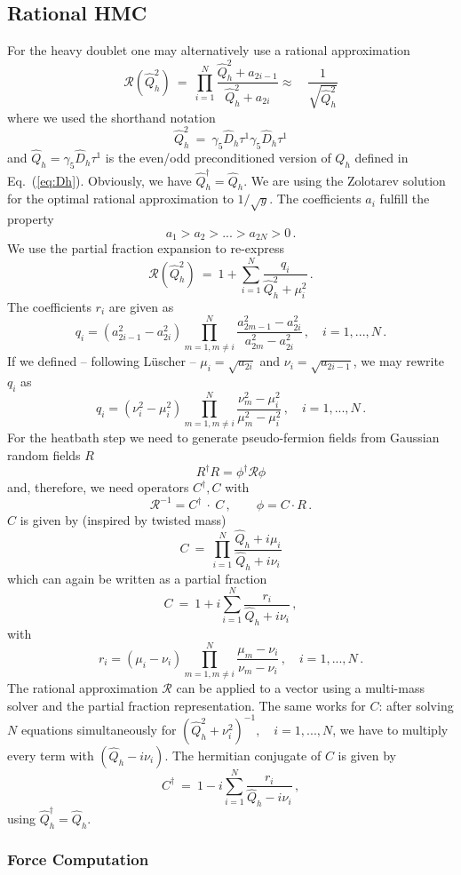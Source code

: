 \subsection{Rational HMC}

For the heavy doublet one may alternatively use a rational
approximation 
\[
\mathcal{R}(\hat Q_h^2)\ = \ \prod_{i = 1}^N \frac{\hat Q_h^2 +
  a_{2i-1}}{\hat Q_h^2 + a_{2i}}\approx\quad\frac{1}{\sqrt{\hat Q_h^2}}
\]
where we used the shorthand notation
\[
\hat Q_h^2\ =\ \gamma_5 \hat D_h \tau^1\gamma_5\hat D_h \tau^1 
\]
and $\hat Q_h=\gamma_5\hat D_h\tau^1$ is the even/odd preconditioned version
of $Q_h$ defined in Eq.~(\ref{eq:Dh}). Obviously, we have $\hat
Q_h^\dagger = \hat Q_h$. 
We are using the Zolotarev solution for the
optimal rational approximation to $1/\sqrt{y}$. The coefficients $a_i$
fulfill the property
\[
a_1 > a_2 > ... > a_{2N} > 0\, .
\]
We use the partial fraction expansion to re-express
\[
\mathcal{R}(\hat Q_h^2)\ = \ 1 + \sum_{i=1}^{N} \frac{q_i}{\hat Q_h^2 +
  \mu_i^2}\, .
\]
The coefficients $r_i$ are given as
\[
q_i = (a_{2i-1}^2 - a_{2i}^2) \prod_{m=1, m\neq i}^N \frac{a_{2m-1}^2
  - a_{2i}^2}{a_{2m}^2 - a_{2i}^2}\,,\quad i = 1,...,N\,.
\]
If we defined -- following L{\"u}scher -- $\mu_i = \sqrt{a_{2i}}$ and $\nu_i
= \sqrt{a_{2i-1}}$, we may rewrite $q_i$ as
\[
q_i = (\nu_i^2 - \mu_i^2)\prod_{m=1, m\neq i}^N \frac{\nu_m^2 -
  \mu_i^2}{\mu_m^2 - \mu_i^2}\,,\quad i = 1,...,N\, .
\]
For the heatbath step we need to generate pseudo-fermion fields from
Gaussian random fields $R$
\[
R^\dagger R = \phi^\dagger \mathcal{R} \phi
\]
and, therefore, we need operators $C^\dagger, C$ with
\[
\mathcal{R}^{-1} = C^\dagger\ \cdot\ C\,,\qquad \phi = C\cdot R\,.
\]
$C$ is given by (inspired by twisted mass)
\[
C\ =\ \prod_{i=1}^N \frac{\hat Q_h + i\mu_i}{\hat Q_h + i\nu_i}
\]
which can again be written as a partial fraction
\[
C\ =\ 1 + i\sum_{i=1}^N \frac{r_i}{\hat Q_h + i\nu_i}\,,
\]
with
\[
r_i = (\mu_i - \nu_i)\prod_{m=1, m\neq i}^N \frac{\mu_m -
  \nu_i}{\nu_m - \nu_i}\,,\quad i = 1,...,N\, .
\]
The rational approximation $\mathcal{R}$ can be applied to a vector
using a multi-mass solver and the partial fraction representation. The
same works for $C$: after solving $N$ equations simultaneously for
$(\hat Q_h^2 + \nu_i^2)^{-1},\quad i = 1,...,N$, we have to multiply
every term with $(\hat Q_h - i\nu_i)$. The hermitian conjugate of $C$
is given by
\[
C^\dagger\ =\ 1 - i\sum_{i=1}^N \frac{r_i}{\hat Q_h - i\nu_i}\,,
\]
using $\hat Q_h^\dagger = \hat Q_h$.

\subsubsection{Force Computation}

